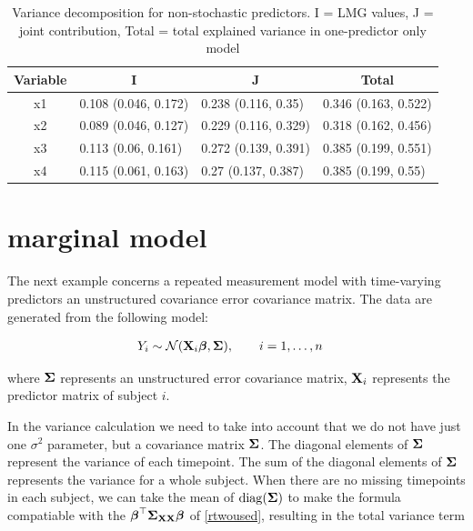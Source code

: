\documentclass[11pt,a4paper,twoside]{book}\usepackage[]{graphicx}\usepackage[]{color}
\begin{document}
\begin{table}[h]
\caption{Variance decomposition for non-stochastic predictors. I = LMG values, J = joint contribution, Total = total explained variance in one-predictor only model}
\centering
\begin{tabular}{clll}
  \toprule
  \multicolumn{1}{c}{\textbf{Variable}} & \multicolumn{1}{c}{\textbf{I}} &\multicolumn{1}{c}{\textbf{J}} & \multicolumn{1}{c}{\textbf{Total}} \\
  \hline
x1 & 0.108 (0.046, 0.172)  & 0.238 (0.116, 0.35)   & 0.346 (0.163, 0.522)  \\ 
x2 & 0.089 (0.046, 0.127)  & 0.229 (0.116, 0.329)   & 0.318 (0.162, 0.456)  \\ 
x3 & 0.113 (0.06, 0.161)  & 0.272 (0.139, 0.391)   & 0.385 (0.199, 0.551)  \\ 
x4 & 0.115 (0.061, 0.163)  & 0.27 (0.137, 0.387)   & 0.385 (0.199, 0.55)  \\ 
   \bottomrule
\end{tabular}
\label{tbl:repeatedcormod.tot}
\end{table}



\section{marginal  model}

The next example concerns a repeated measurement model with time-varying predictors an unstructured covariance error covariance matrix. The data are generated from the following model:

\begin{align} 
&Y_{i} \sim \mathcal{N}({\mathbf{X}}_{i} {\boldsymbol{\beta}}, {\boldsymbol{\Sigma}}{}), \qquad i = 1, \dots, n
\end{align} 

where ${\boldsymbol{\Sigma}}{}$ represents an unstructured error covariance matrix, ${\mathbf{X}}_{i}$ represents the predictor matrix of subject $i$.

In the variance calculation we need to take into account that we do not have just one $\sigma^2$ parameter, but a covariance matrix ${\boldsymbol{\Sigma}}{}$. The diagonal elements of ${\boldsymbol{\Sigma}}{}$ represent the variance of each timepoint. The sum of the diagonal elements of ${\boldsymbol{\Sigma}}{}$ represents the variance for a whole subject. When there are no missing timepoints in each subject, we can  take the mean of $\operatorname{diag}({\boldsymbol{\Sigma}}{})$ to make the formula compatiable with the ${\boldsymbol{\beta}}^\top {\boldsymbol{\Sigma}}{}_{{\mathbf{X}} {\mathbf{X}}}  {\boldsymbol{\beta}}$ of \eqref{rtwoused}, resulting in the total variance term
\end{document}
